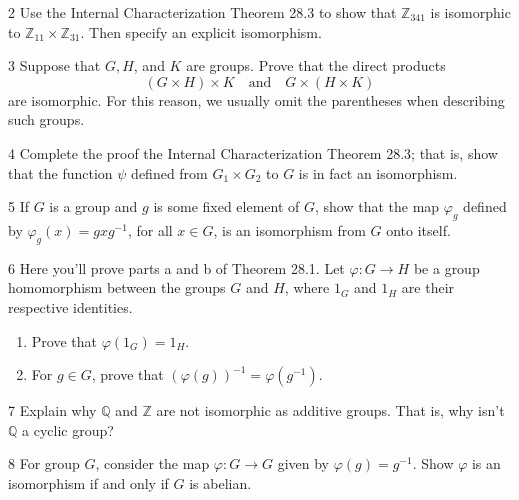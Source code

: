 \begin{problem}{2}
    Use the Internal Characterization Theorem 28.3 to show that $\mathbb{Z}_{341}$ is
    isomorphic to $\mathbb{Z}_{11} \times \mathbb{Z}_{31}$. Then specify an explicit
    isomorphism.
\end{problem}
\unsolved

\begin{problem}{3}
    Suppose that $G, H$, and $K$ are groups. Prove that the direct products
    \[(G \times H) \times K \quad\text{and}\quad G \times (H \times K)\]
    are isomorphic. For this reason, we usually omit the parentheses when describing such
    groups.
\end{problem}
\unsolved

\begin{problem}{4}
    Complete the proof the Internal Characterization Theorem 28.3; that is, show that the
    function $\psi$ defined from $G_1 \times G_2$ to $G$ is in fact an isomorphism.
\end{problem}
\unsolved

\begin{problem}{5}
    If $G$ is a group and $g$ is some fixed element of $G$, show that the map $\varphi_g$
    defined by $\varphi_g(x) = gxg^{-1}$, for all $x \in G$, is an isomorphism from $G$
    onto itself.
\end{problem}
\unsolved

\begin{problem}{6}
    Here you'll prove parts a and b of Theorem 28.1. Let $\varphi : G \to H$ be a group
    homomorphism between the groups $G$ and $H$, where $1_G$ and $1_H$ are their respective
    identities.
    \begin{enumerate}
        \item[(a)] Prove that $\varphi(1_G) = 1_H$.
        \item[(b)] For $g \in G$, prove that ${(\varphi(g))}^{-1} = \varphi(g^{-1})$.
    \end{enumerate}
\end{problem}
\unsolved

\begin{problem}{7}
    Explain why $\mathbb{Q}$ and $\mathbb{Z}$ are not isomorphic as additive groups. That
    is, why isn't $\mathbb{Q}$ a cyclic group?
\end{problem}
\unsolved

\begin{problem}{8}
    For group $G$, consider the map $\varphi : G \to G$ given by $\varphi(g) = g^{-1}$.
    Show $\varphi$ is an isomorphism if and only if $G$ is abelian.
\end{problem}
\unsolved

